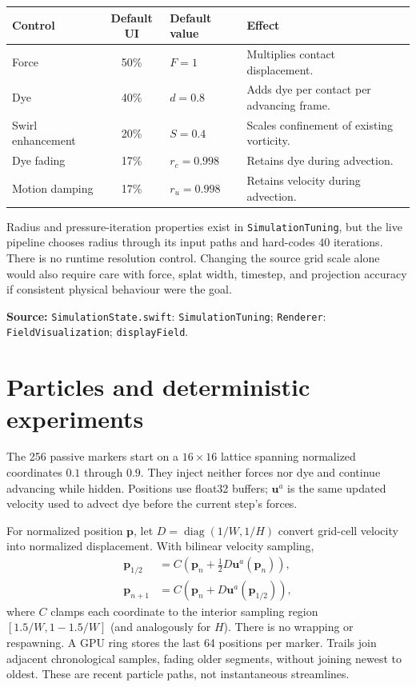 \documentclass[11pt,a4paper]{article}
\newcommand{\uvec}{\mathbf{u}}
\newcommand{\src}[1]{\par{\footnotesize\raggedright\color{teal}\textbf{Source:} #1\par}}
\newcommand{\code}[1]{\texttt{#1}}
\newcommand{\page}[1]{\clearpage\section{#1}}
\begin{document}
\begin{tabularx}{\linewidth}{@{}lclY@{}}
\toprule
Control & Default UI & Default value & Effect \\
\midrule
Force & 50\% & $F=1$ & Multiplies contact displacement. \\
Dye & 40\% & $d=0.8$ & Adds dye per contact per advancing frame. \\
Swirl enhancement & 20\% & $S=0.4$ & Scales confinement of existing vorticity. \\
Dye fading & 17\% & $r_c=0.998$ & Retains dye during advection. \\
Motion damping & 17\% & $r_u=0.998$ & Retains velocity during advection. \\
\bottomrule
\end{tabularx}

Radius and pressure-iteration properties exist in \code{SimulationTuning}, but
the live pipeline chooses radius through its input paths and hard-codes 40
iterations. There is no runtime resolution control. Changing the source grid
scale alone would also require care with force, splat width, timestep, and
projection accuracy if consistent physical behaviour were the goal.
\src{\code{SimulationState.swift}: \code{SimulationTuning}; \code{Renderer}:
\code{FieldVisualization}; \code{displayField}.}

\page{Particles and deterministic experiments}
The 256 passive markers start on a $16\times16$ lattice spanning normalized coordinates $0.1$ through $0.9$. They inject neither forces nor dye and continue advancing while hidden. Positions use float32 buffers; $\uvec^a$ is the same updated velocity used to advect dye before the current step's forces.

For normalized position $\mathbf p$, let $D=\operatorname{diag}(1/W,1/H)$ convert grid-cell velocity into normalized displacement. With bilinear velocity sampling,
\begin{align}
 \mathbf p_{1/2}&=C(\mathbf p_n+\tfrac12 D\uvec^a(\mathbf p_n)),\\
 \mathbf p_{n+1}&=C(\mathbf p_n+D\uvec^a(\mathbf p_{1/2})),
\end{align}
where $C$ clamps each coordinate to the interior sampling region $[1.5/W,1-1.5/W]$ (and analogously for $H$). There is no wrapping or respawning. A GPU ring stores the last 64 positions per marker. Trails join adjacent chronological samples, fading older segments, without joining newest to oldest. These are recent particle paths, not instantaneous streamlines.
\end{document}

